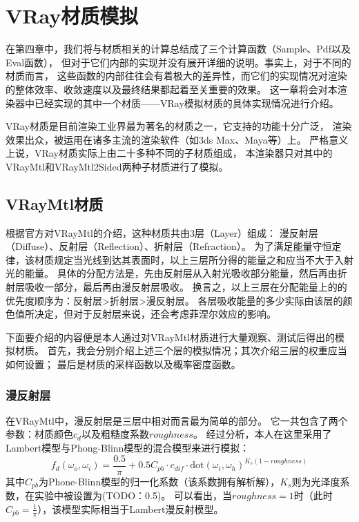 \chapter{VRay材质模拟}
\label{cha:vray}

在第四章中，我们将与材质相关的计算总结成了三个计算函数（Sample、Pdf以及Eval函数），
但对于它们内部的实现并没有展开详细的说明。事实上，对于不同的材质而言，
这些函数的内部往往会有着极大的差异性，而它们的实现情况对渲染的整体效率、收敛速度以及最终结果都起着至关重要的效果。
这一章将会对本渲染器中已经实现的其中一个材质——VRay模拟材质的具体实现情况进行介绍。

VRay材质\cite{VRay}是目前渲染工业界最为著名的材质之一，它支持的功能十分广泛，
渲染效果出众，被运用在诸多主流的渲染软件（如3ds Max、Maya等）上。
严格意义上说，VRay材质实际上由二十多种不同的子材质组成，
本渲染器只对其中的VRayMtl和VRayMtl2Sided两种子材质进行了模拟。


\section{VRayMtl材质}

根据官方对VRayMtl的介绍，这种材质共由3层（Layer）组成：
漫反射层（Diffuse）、反射层（Reflection）、折射层（Refraction）。
为了满足能量守恒定律，该材质规定当光线到达其表面时，以上三层所分得的能量之和应当不大于入射光的能量。
具体的分配方法是，先由反射层从入射光吸收部分能量，然后再由折射层吸收一部分，最后再由漫反射层吸收。
换言之，以上三层在分配能量上的的优先度顺序为：反射层>折射层>漫反射层。
各层吸收能量的多少实际由该层的颜色值所决定，但对于反射层来说，还会考虑菲涅尔效应的影响。

下面要介绍的内容便是本人通过对VRayMtl材质进行大量观察、测试后得出的模拟材质。
首先，我会分别介绍上述三个层的模拟情况；其次介绍三层的权重应当如何设置；
最后是材质的采样函数以及概率密度函数。

\subsection{漫反射层}

在VRayMtl中，漫反射层是三层中相对而言最为简单的部分。
它一共包含了两个参数：材质颜色$c_{d}$以及粗糙度系数$roughness$。
经过分析，本人在这里采用了Lambert模型与Phong-Blinn模型的混合模型来进行模拟：
\begin{equation}
f_d(\omega_o, \omega_i) = \frac{0.5}{\pi} + 0.5C_{pb}\cdot c_{dif} \cdot \text{dot}(\omega_i, \omega_h)^{K_s(1-roughness)}
\end{equation}
其中$C_{pb}$为Phone-Blinn模型的归一化系数（该系数拥有解析解\cite{Phong}），$K_s$则为光泽度系数，在实验中被设置为(TODO：0.5)。
可以看出，当$roughness=1$时（此时$C_{pb}=\frac{1}{\pi}$），该模型实际相当于Lambert漫反射模型。

